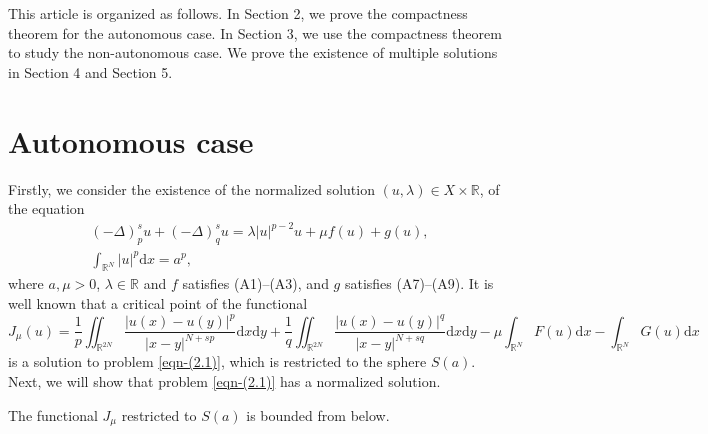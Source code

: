 \documentclass[reqno]{amsart}
\begin{document}
This article is organized as follows.
In Section 2, we prove the compactness theorem for the autonomous case.
In Section 3, we use the compactness theorem to study the non-autonomous case.
We prove the existence of multiple solutions in Section 4 and Section 5.

\section{Autonomous case}

Firstly, we consider the existence of the normalized solution
$(u,\lambda)\in X \times\mathbb {R}$, of the equation
\begin{equation}\label{eqn-(2.1)}
\begin{gathered}
(-\Delta)_{p}^{s} u+(-\Delta)_q^{s} u=\lambda |u|^{p-2}u+\mu f(u)+g(u),\\
\int_{\mathbb {R}^{N}}|u|^p \mathrm{d}x=a^p,
\end{gathered}
\end{equation}
where $a,\mu>0$, $\lambda\in\mathbb{R}$ and $f$ satisfies (A1)--(A3), and  $g$ satisfies
(A7)--(A9). It is well known that a critical point of the functional
$$J
_\mu(u)=\frac{1}{p}\iint_{\mathbb{R}^{2N}}\frac{|u(x)-u(y)|^p}{|x-y|^{N+sp}}
\mathrm{d}x\mathrm{d}y+\frac{1}{q}\iint_{\mathbb{R}^{2N}}\frac{|u(x)-u(y)|^q}{|x-y|^{N+sq}}\mathrm{d}x\mathrm{d}y-\mu\int_{\mathbb{R}^N}F(u)\mathrm{d}x-\int_{\mathbb{R}^{N}}G(u)\mathrm{d}x
$$
is a solution to problem \eqref{eqn-(2.1)},
which is restricted to the sphere $S(a)$.
Next, we will show that problem \eqref{eqn-(2.1)} has a normalized solution.

\begin{lemma}\label{lem:2.1}
The functional $J_\mu$ restricted to $S(a)$ is bounded from below.
\end{lemma}
\end{document}
